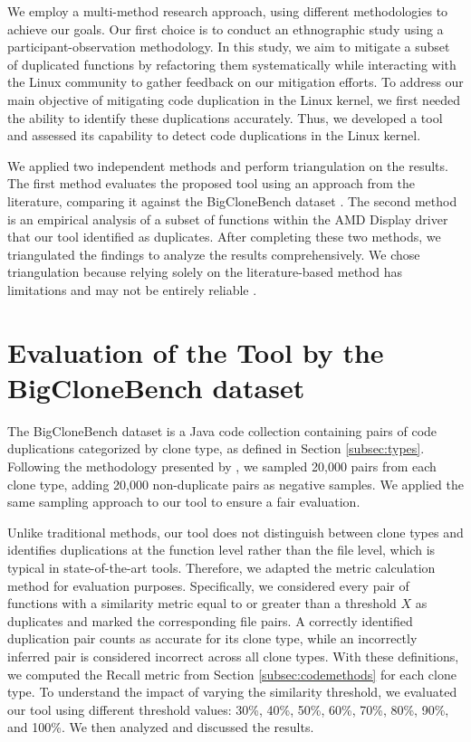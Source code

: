 We employ a multi-method research approach, using different methodologies to achieve our goals. Our first choice is to conduct an ethnographic study using a participant-observation methodology. In this study, we aim to mitigate a subset of duplicated functions by refactoring them systematically while interacting with the Linux community to gather feedback on our mitigation efforts. To address our main objective of mitigating code duplication in the Linux kernel, we first needed the ability to identify these duplications accurately. Thus, we developed a tool and assessed its capability to detect code duplications in the Linux kernel.

We applied two independent methods and perform triangulation on the results. 
The first method evaluates the proposed tool using an approach from the literature, 
comparing it against the BigCloneBench dataset \citep{bigclonebench}. 
The second method is an empirical analysis of a subset of functions within the 
AMD Display driver that our tool identified as duplicates. After completing these two 
methods, we triangulated the findings to analyze the results comprehensively. 
We chose triangulation because relying solely on the literature-based method has 
limitations and may not be entirely reliable \citep{bigfail, litreview}.

\section{Evaluation of the Tool by the BigCloneBench dataset}

\label{sec:metbig}

The BigCloneBench dataset \citep{bigclonebench} is a Java code collection containing pairs of code duplications categorized by clone type, as defined in Section \ref{subsec:types}.
%
Following the methodology presented by \citep{tailor}, we sampled 20,000 pairs from each clone type, adding 20,000 non-duplicate pairs as negative samples. We applied the same sampling approach to our tool to ensure a fair evaluation.

Unlike traditional methods, our tool does not distinguish between clone types and identifies duplications at the function level rather than the file level, which is typical in state-of-the-art tools. Therefore, we adapted the metric calculation method for evaluation purposes. Specifically, we considered every pair of functions with a similarity metric equal to or greater than a threshold \(X\) as duplicates and marked the corresponding file pairs. A correctly identified duplication pair counts as accurate for its clone type, while an incorrectly inferred pair is considered incorrect across all clone types. With these definitions, we computed the Recall metric from Section \ref{subsec:codemethods} for each clone type.
%
To understand the impact of varying the similarity threshold, we evaluated our tool using different threshold values: 30\%, 40\%, 50\%, 60\%, 70\%, 80\%, 90\%, and 100\%. We then analyzed and discussed the results.

